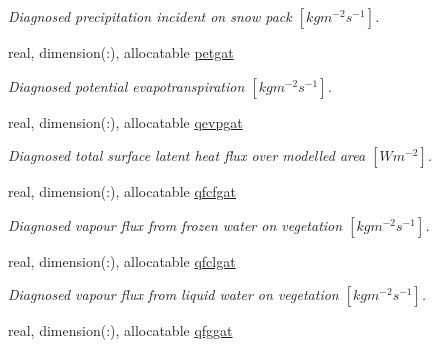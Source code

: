 \begin{DoxyCompactItemize}
\begin{DoxyCompactList}\small\item\em Diagnosed precipitation incident on snow pack $[kg m^{-2} s^{-1} ]$. \end{DoxyCompactList}\item 
\hypertarget{structclass__statevars_1_1class__gather_a04edd57712e8beaf9bdeaa9a30ebdc98}{}real, dimension(\+:), allocatable \hyperlink{structclass__statevars_1_1class__gather_a04edd57712e8beaf9bdeaa9a30ebdc98}{petgat}\label{structclass__statevars_1_1class__gather_a04edd57712e8beaf9bdeaa9a30ebdc98}

\begin{DoxyCompactList}\small\item\em Diagnosed potential evapotranspiration $[kg m^{-2} s^{-1} ]$. \end{DoxyCompactList}\item 
\hypertarget{structclass__statevars_1_1class__gather_acdc9b2d446f05170d5b28478611eab6e}{}real, dimension(\+:), allocatable \hyperlink{structclass__statevars_1_1class__gather_acdc9b2d446f05170d5b28478611eab6e}{qevpgat}\label{structclass__statevars_1_1class__gather_acdc9b2d446f05170d5b28478611eab6e}

\begin{DoxyCompactList}\small\item\em Diagnosed total surface latent heat flux over modelled area $[W m^{-2} ]$. \end{DoxyCompactList}\item 
\hypertarget{structclass__statevars_1_1class__gather_acb282361ea17fa4ed02bfb141fef14fb}{}real, dimension(\+:), allocatable \hyperlink{structclass__statevars_1_1class__gather_acb282361ea17fa4ed02bfb141fef14fb}{qfcfgat}\label{structclass__statevars_1_1class__gather_acb282361ea17fa4ed02bfb141fef14fb}

\begin{DoxyCompactList}\small\item\em Diagnosed vapour flux from frozen water on vegetation $[kg m^{-2} s^{-1} ]$. \end{DoxyCompactList}\item 
\hypertarget{structclass__statevars_1_1class__gather_a81758cc8ae1f6a50b8f9a7c800e9edb5}{}real, dimension(\+:), allocatable \hyperlink{structclass__statevars_1_1class__gather_a81758cc8ae1f6a50b8f9a7c800e9edb5}{qfclgat}\label{structclass__statevars_1_1class__gather_a81758cc8ae1f6a50b8f9a7c800e9edb5}

\begin{DoxyCompactList}\small\item\em Diagnosed vapour flux from liquid water on vegetation $[kg m^{-2} s^{-1} ]$. \end{DoxyCompactList}\item 
\hypertarget{structclass__statevars_1_1class__gather_a0bf4598087e85171e6b55bded967bd01}{}real, dimension(\+:), allocatable \hyperlink{structclass__statevars_1_1class__gather_a0bf4598087e85171e6b55bded967bd01}{qfggat}\label{structclass__statevars_1_1class__gather_a0bf4598087e85171e6b55bded967bd01}


\end{DoxyCompactItemize}
